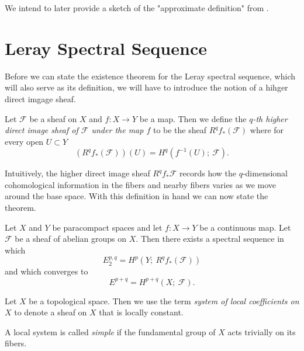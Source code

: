 \documentclass[11pt]{amsart}
\begin{document}
We intend to later provide  a sketch of the "approximate definition" from \cite{risingsea}.







\section{Leray Spectral Sequence}
Before we can state the existence theorem for the Leray spectral sequence, which will also serve as its definition, we will have to introduce the notion of a hihger direct imgage sheaf. 

\begin{definition}
Let $\mathcal{F}$ be a sheaf on $X$ and $f: X\to Y$ be a map. Then we define the \textit{$q$-th higher direct image sheaf of $\mathcal{F}$ under the map $f$} to be the sheaf $R^qf_*(\mathcal{F})$ where for every open $U\subset Y$
\begin{equation*}
    (R^qf_*(\mathcal{F}))(U) =H^q(f^{-1}(U);\  \mathcal{F}).
\end{equation*}
    
\end{definition}
Intuitively, the higher direct image sheaf $R^qf_*\mathcal F$ records how the $q$-dimensional cohomological information in the fibers and nearby fibers varies as we move around the base space. With this definition in hand we can now state the theorem.
\begin{theorem}
    Let $X$ and $Y$ be paracompact  spaces and let $f:X\to Y$ be a continuous map. Let $\mathcal{F}$ be a sheaf of abelian groups on $X$. Then there exists a spectral sequence in which
    \begin{equation*}
        E^{p,q}_2  = H^p\left(Y;\  R^q f_* (\mathcal{F})\right)
    \end{equation*}
    and which converges to 
    \begin{equation*}
        E^{p+q} = H^{p+q}(X;\  \mathcal{F}).
    \end{equation*}
\end{theorem}

\begin{definition}
   Let $X$ be a topological space. Then we use the term \textit{system of local coefficients on $X$} to denote a sheaf on $X$ that is locally constant.

    A local system is called \textit{simple} if the fundamental group of $X$ acts trivially on its fibers.   

   
\end{definition}
\end{document}
